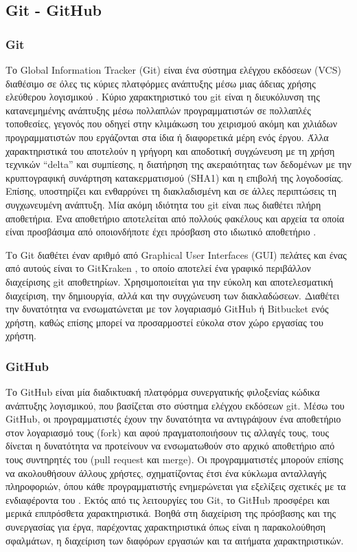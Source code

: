 \subsection{Git - GitHub}
\subsubsection{Git}
Το Global Information Tracker (Git) είναι ένα σύστημα ελέγχου εκδόσεων (VCS) διαθέσιμο σε όλες τις κύριες πλατφόρμες ανάπτυξης μέσω μιας άδειας χρήσης ελεύθερου λογισμικού \cite{spinellis2012git}. Κύριο χαρακτηριστικό του git είναι η διευκόλυνση της κατανεμημένης ανάπτυξης μέσω πολλαπλών προγραμματιστών σε πολλαπλές τοποθεσίες, γεγονός που οδηγεί στην κλιμάκωση του χειρισμού ακόμη και χιλιάδων προγραμματιστών που εργάζονται στα ίδια ή διαφορετικά μέρη ενός έργου. Άλλα χαρακτηριστικά του αποτελούν η γρήγορη και αποδοτική συγχώνευση με τη χρήση τεχνικών ``delta'' και συμπίεσης, η διατήρηση της ακεραιότητας των δεδομένων με την κρυπτογραφική συνάρτηση κατακερματισμού (SHA1) και η επιβολή της λογοδοσίας. Επίσης, υποστηρίζει και ενθαρρύνει τη διακλαδισμένη και σε άλλες περιπτώσεις τη συγχωνευμένη ανάπτυξη. Μία ακόμη ιδιότητα του git είναι πως διαθέτει πλήρη αποθετήρια. Ένα αποθετήριο αποτελείται από πολλούς φακέλους και αρχεία τα οποία είναι προσβάσιμα από οποιονδήποτε έχει πρόσβαση στο ιδιωτικό αποθετήριο \cite{loeliger2012version}. 

Το Git διαθέτει έναν αριθμό από Graphical User Interfaces (GUI) πελάτες και ένας από αυτούς είναι το GitKraken \cite{gitkrakenwhatisit}, το οποίο αποτελεί ένα γραφικό περιβάλλον διαχείρισης git αποθετηρίων. Χρησιμοποιείται για την εύκολη και αποτελεσματική διαχείριση, την δημιουργία, αλλά και την συγχώνευση των διακλαδώσεων. Διαθέτει την δυνατότητα να ενσωματώνεται με τον λογαριασμό GitHub ή Bitbucket ενός χρήστη, καθώς επίσης μπορεί να προσαρμοστεί εύκολα στον χώρο εργασίας του χρήστη.

\subsubsection{GitHub}
Το GitHub είναι μία διαδικτυακή πλατφόρμα συνεργατικής φιλοξενίας κώδικα ανάπτυξης λογισμικού, που βασίζεται στο σύστημα ελέγχου εκδόσεων git. Μέσω του GitHub, οι προγραμματιστές έχουν την δυνατότητα να αντιγράψουν ένα αποθετήριο στον λογαριασμό τους (fork) και αφού πραγματοποιήσουν τις αλλαγές τους, τους δίνεται η δυνατότητα να προτείνουν  να ενσωματωθούν στο αρχικό αποθετήριο από τους συντηρητές του (pull request και merge). Οι προγραμματιστές μπορούν επίσης να ακολουθήσουν άλλους χρήστες, σχηματίζοντας έτσι ένα κύκλωμα ανταλλαγής πληροφοριών, όπου κάθε προγραμματιστής ενημερώνεται για εξελίξεις σχετικές με τα ενδιαφέροντα του \cite{kalliamvakou2014promises}. Εκτός από τις λειτουργίες του Git, το GitHub προσφέρει και μερικά επιπρόσθετα χαρακτηριστικά. Βοηθά στη διαχείριση της πρόσβασης και της συνεργασίας για έργα, παρέχοντας χαρακτηριστικά όπως είναι η παρακολούθηση σφαλμάτων, η διαχείριση των διαφόρων εργασιών και τα αιτήματα χαρακτηριστικών.

